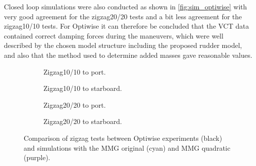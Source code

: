 Closed loop simulations were also conducted as shown in \autoref{fig:sim_optiwise} with very good agreement for the zigzag20/20 tests and a bit less agreement for the zigzag10/10 tests.
For Optiwise it can therefore be concluded that
the VCT data contained correct damping forces during the maneuvers, which were well
described by the chosen model structure including the proposed rudder model, and also that the method used to determine added masses gave reasonable values.
\begin{figure}[h]
     \centering
     \begin{subfigure}[b]{0.49\textwidth}
         \centering
         
        \caption{Zigzag10/10 to port.}
        \label{fig:sim_optiwise_10_port}
     \end{subfigure}
     \hfill
     \begin{subfigure}[b]{0.49\textwidth}
         
        \caption{Zigzag10/10 to starboard.}
        \label{fig:sim_optiwise_10_stbd}
     \end{subfigure}
     \vfill
     \begin{subfigure}[b]{0.49\textwidth}
         \centering
         
        \caption{Zigzag20/20 to port.}
        \label{fig:sim_optiwise_20_port}
     \end{subfigure}
     \hfill
     \begin{subfigure}[b]{0.49\textwidth}
         
        \caption{Zigzag20/20 to starboard.}
        \label{fig:sim_optiwise_20_stbd}
     \end{subfigure}
     
        \caption{Comparison of zigzag tests between Optiwise experiments (black) and simulations with the MMG original (cyan) and MMG quadratic (purple).}
        \label{fig:sim_optiwise}
\end{figure}